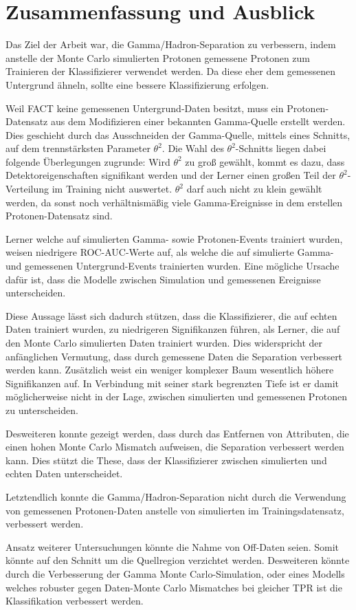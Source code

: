 \chapter{Zusammenfassung und Ausblick}
Das Ziel der Arbeit war, die Gamma/Hadron-Separation zu verbessern, indem anstelle der Monte Carlo simulierten Protonen gemessene Protonen zum Trainieren der Klassifizierer verwendet werden. 
Da diese eher dem gemessenen Untergrund ähneln, sollte eine bessere Klassifizierung erfolgen.

Weil FACT keine gemessenen Untergrund-Daten besitzt, muss ein Protonen-Datensatz aus dem Modifizieren einer bekannten Gamma-Quelle erstellt werden. 
Dies geschieht durch das Ausschneiden der Gamma-Quelle, mittels eines Schnitts, auf dem trennstärksten Parameter $\theta^{2}$.
Die Wahl des $\theta^{2}$-Schnitts liegen dabei folgende Überlegungen zugrunde:
Wird $\theta^{2}$ zu groß gewählt, kommt es dazu, dass Detektoreigenschaften signifikant werden und der Lerner einen großen Teil der $\theta^{2}$-Verteilung im Training nicht auswertet. 
$\theta^{2}$ darf auch nicht zu klein gewählt werden, da sonst noch verhältnismäßig viele Gamma-Ereignisse in dem erstellen Protonen-Datensatz sind.

Lerner welche auf simulierten Gamma- sowie Protonen-Events trainiert wurden, weisen niedrigere ROC-AUC-Werte auf, als welche die auf simulierte Gamma- und gemessenen Untergrund-Events trainierten wurden.
Eine mögliche Ursache dafür ist, dass die Modelle zwischen Simulation und gemessenen Ereignisse unterscheiden.

Diese Aussage lässt sich dadurch stützen, dass die Klassifizierer, die auf echten Daten trainiert wurden, zu niedrigeren Signifikanzen führen, als Lerner, die auf den Monte Carlo simulierten Daten trainiert wurden. 
Dies widerspricht der anfänglichen Vermutung, dass durch gemessene Daten die Separation verbessert werden kann. 
Zusätzlich weist ein weniger komplexer Baum wesentlich höhere Signifikanzen auf. 
In Verbindung mit seiner stark begrenzten Tiefe ist er damit möglicherweise nicht in der Lage, zwischen simulierten und gemessenen Protonen zu unterscheiden. 

Desweiteren konnte gezeigt werden, dass durch das Entfernen von Attributen, die einen hohen Monte Carlo Mismatch aufweisen, die Separation verbessert werden kann. 
Dies stützt die These, dass der Klassifizierer zwischen simulierten und echten Daten unterscheidet.

Letztendlich konnte die Gamma/Hadron-Separation nicht durch die Verwendung von gemessenen Protonen-Daten anstelle von simulierten im Trainingsdatensatz, verbessert werden. 

Ansatz weiterer Untersuchungen könnte die Nahme von Off-Daten seien.
Somit könnte auf den Schnitt um die Quellregion verzichtet werden. 
Desweiteren könnte durch die Verbesserung der Gamma Monte Carlo-Simulation, oder eines Modells welches robuster gegen Daten-Monte Carlo Mismatches bei gleicher TPR ist die Klassifikation verbessert werden.
